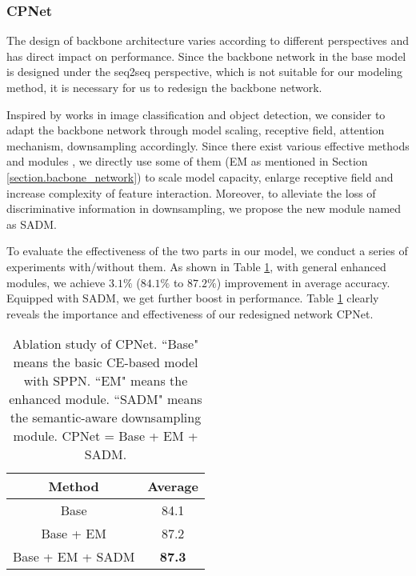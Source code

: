\documentclass[final]{cvpr}
\begin{document}
\subsubsection{CPNet}
The design of backbone architecture varies according to different perspectives and has direct impact on performance. Since the backbone network in the base model is designed under the seq2seq perspective, which is not suitable for our modeling method, it is necessary for us to redesign the backbone network. 

Inspired by works in image classification and object detection, we consider to adapt the backbone network through model scaling, receptive field, attention mechanism, downsampling accordingly. Since there exist various effective methods and modules \cite{tan2019efficientnet,woo2018cbam,lin2017feature}, we directly use some of them (EM as mentioned in Section \ref{section.bacbone_network}) to scale model capacity, enlarge receptive field and increase complexity of feature interaction.
Moreover, to alleviate the loss of discriminative information in downsampling, we propose the new module named as SADM. 

To evaluate the effectiveness of the two parts in our model, we conduct a series of experiments with/without them. As shown in Table \ref{table.model_redesign}, with general enhanced modules, we achieve $3.1\%$ ($84.1\%$ to $87.2\%$) improvement in average accuracy. Equipped with SADM, we get further boost in performance. Table \ref{table.model_redesign} clearly reveals the importance and effectiveness of our redesigned network CPNet.


\begin{table}[ht]
    \caption{Ablation study of CPNet. ``Base" means the basic CE-based model with SPPN.
    ``EM" means the enhanced module. ``SADM" means the semantic-aware downsampling module. CPNet = Base + EM + SADM.}
    \label{table.model_redesign}
	\centering
	\begin{tabular}{ | c | c |}
		\hline
		 	Method & Average \\ 
		\hline
		Base & 84.1 \\
		\hline
		Base + EM & 87.2 \\
		\hline
		Base + EM + SADM & \textbf{87.3}\\
		\hline
	\end{tabular}
\end{table}
\end{document}
